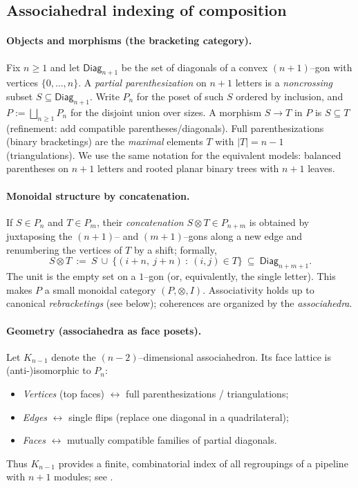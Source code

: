\documentclass[11pt]{article}
\numberwithin{equation}{section}
\theoremstyle{upright}
\begin{document}
\subsection{Associahedral indexing of composition}
\label{subsec:assoc-indexing}

\paragraph{Objects and morphisms (the bracketing category).}
Fix $n\ge 1$ and let $\mathsf{Diag}_{n+1}$ be the set of diagonals of a convex $(n{+}1)$–gon
with vertices $\{0,\dots,n\}$.
A \emph{partial parenthesization} on $n{+}1$ letters is a \emph{noncrossing} subset
$S\subseteq \mathsf{Diag}_{n+1}$. Write $P_n$ for the poset of such $S$ ordered by inclusion,
and $P:=\bigsqcup_{n\ge 1} P_n$ for the disjoint union over sizes.
A morphism $S\to T$ in $P$ is $S\subseteq T$ (refinement: add compatible parentheses/diagonals).
Full parenthesizations (binary bracketings) are the \emph{maximal} elements $T$ with
$|T|=n{-}1$ (triangulations).
We use the same notation for the equivalent models: balanced parentheses on $n{+}1$ letters
and rooted planar binary trees with $n{+}1$ leaves.

\paragraph{Monoidal structure by concatenation.}
If $S\in P_n$ and $T\in P_m$, their \emph{concatenation} $S\otimes T\in P_{n+m}$
is obtained by juxtaposing the $(n{+}1)$– and $(m{+}1)$–gons along a new edge and
renumbering the vertices of $T$ by a shift; formally,
\[
S\otimes T \ :=\ S\ \cup\ \bigl\{(i{+}n,\ j{+}n)\ :\ (i,j)\in T\bigr\}\ \subseteq\ \mathsf{Diag}_{n+m+1}.
\]
The unit is the empty set on a $1$–gon (or, equivalently, the single letter).
This makes $P$ a small monoidal category $(P,\otimes,I)$.
Associativity holds up to canonical \emph{rebracketings} (see below);
coherences are organized by the \emph{associahedra}.

\paragraph{Geometry (associahedra as face posets).}
Let $K_{n-1}$ denote the $(n{-}2)$–dimensional associahedron.
Its face lattice is (anti-)isomorphic to $P_n$:
\begin{itemize}[leftmargin=*, itemsep=.25ex]
\item \emph{Vertices} (top faces) $\leftrightarrow$ full parenthesizations / triangulations;
\item \emph{Edges} $\leftrightarrow$ single flips (replace one diagonal in a quadrilateral);
\item \emph{Faces} $\leftrightarrow$ mutually compatible families of partial diagonals.
\end{itemize}
Thus $K_{n-1}$ provides a finite, combinatorial index of all regroupings of a pipeline with
$n{+}1$ modules; see \cite{LodayRonco1998,Loday2004,Stasheff1963I}.
\end{document}
